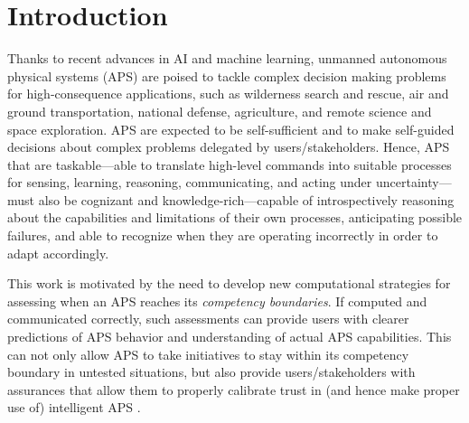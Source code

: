 \section{Introduction}

Thanks to recent advances in AI and machine learning, unmanned autonomous physical systems (APS) are poised to tackle complex decision making problems for high-consequence applications, such as wilderness search and rescue, air and ground transportation, national defense, agriculture, and remote science and space exploration. 
APS are expected to be self-sufficient and to make self-guided decisions about complex problems delegated by users/stakeholders. Hence, APS that are taskable---able to translate high-level commands into suitable processes for sensing, learning, reasoning, communicating, and acting under uncertainty---must also be cognizant and knowledge-rich---capable of introspectively reasoning about the capabilities and limitations of their own processes, anticipating possible failures, and able to recognize when they are operating incorrectly in order to adapt accordingly. %

This work is motivated by the need to develop new computational strategies for assessing when an APS reaches its \emph{competency boundaries}. If computed and communicated correctly, such assessments can provide users with clearer predictions of APS behavior and understanding of actual APS capabilities. This can not only allow APS to take initiatives to stay within its competency boundary in untested situations, but also provide users/stakeholders with assurances that allow them to properly calibrate trust in (and hence make proper use of) intelligent APS \cite{Israelsen2018-es}. 


